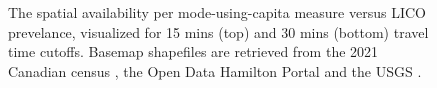 \documentclass[
  authoryear,
  preprint,
  3p]{elsarticle}
\begin{document}
\begin{figure}


\caption{\label{fig-Fig6}The spatial availability per mode-using-capita
measure versus LICO prevelance, visualized for 15 mins (top) and 30 mins
(bottom) travel time cutoffs. Basemap shapefiles are retrieved from the
2021 Canadian census \citep{governmentofcanadaCensusPopulation2023}, the
Open Data Hamilton Portal \citep{opendatahamiltonCityBoundary2023} and
the USGS \citep{greatlakesUSGS2010}.}

\end{figure}%
\end{document}
